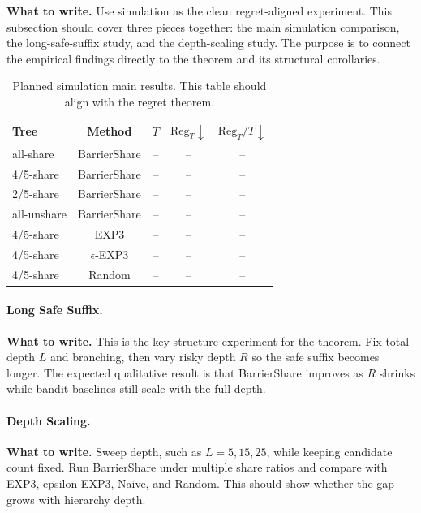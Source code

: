 \documentclass{article}
\newcommand{\towrite}[1]{\noindent\textbf{What to write.} #1}
\begin{document}
\towrite{Use simulation as the clean regret-aligned experiment. This subsection should cover three pieces together: the main simulation comparison, the long-safe-suffix study, and the depth-scaling study. The purpose is to connect the empirical findings directly to the theorem and its structural corollaries.}

\begin{table}[t]
    \centering
    \small
    \caption{Planned simulation main results. This table should align with the regret theorem.}
    \label{tab:sim_main}
    \begin{tabular}{lcccc}
        \toprule
        Tree & Method & $T$ & $\mathrm{Reg}_T \downarrow$ & $\mathrm{Reg}_T/T \downarrow$ \\
        \midrule
        all-share & BarrierShare & -- & -- & -- \\
        4/5-share & BarrierShare & -- & -- & -- \\
        2/5-share & BarrierShare & -- & -- & -- \\
        all-unshare & BarrierShare & -- & -- & -- \\
        4/5-share & EXP3 & -- & -- & -- \\
        4/5-share & $\epsilon$-EXP3 & -- & -- & -- \\
        4/5-share & Random & -- & -- & -- \\
        \bottomrule
    \end{tabular}
\end{table}

\paragraph{Long Safe Suffix.}

\towrite{This is the key structure experiment for the theorem. Fix total depth $L$ and branching, then vary risky depth $R$ so the safe suffix becomes longer. The expected qualitative result is that BarrierShare improves as $R$ shrinks while bandit baselines still scale with the full depth.}

\paragraph{Depth Scaling.}

\towrite{Sweep depth, such as $L=5,15,25$, while keeping candidate count fixed. Run BarrierShare under multiple share ratios and compare with EXP3, epsilon-EXP3, Naive, and Random. This should show whether the gap grows with hierarchy depth.}
\end{document}
